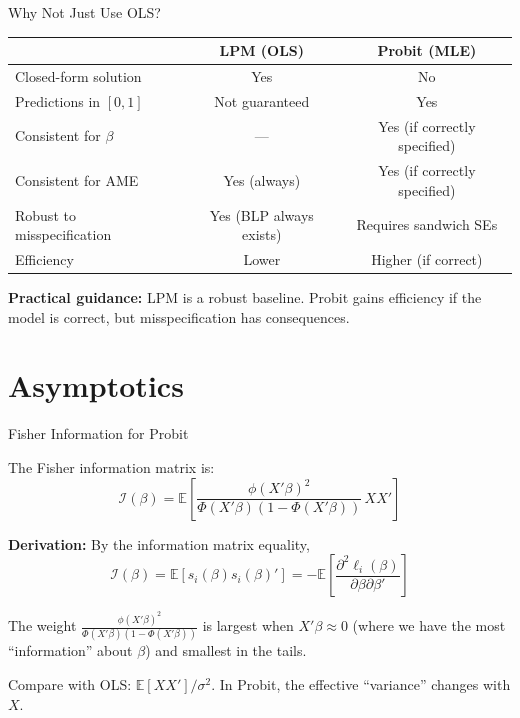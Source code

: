 \documentclass[aspectratio=169, handout, t]{beamer}
\numberwithin{equation}{section}
\begin{document}
\begin{frame}{Why Not Just Use OLS?}

\begin{center}
\renewcommand{\arraystretch}{1.4}
\begin{tabular}{lcc}
\toprule
& \textbf{LPM (OLS)} & \textbf{Probit (MLE)} \\
\midrule
Closed-form solution & Yes & No \\
Predictions in $[0,1]$ & Not guaranteed & Yes \\
Consistent for $\beta$ & --- & Yes (if correctly specified) \\
Consistent for AME & Yes (always) & Yes (if correctly specified) \\
Robust to misspecification & Yes (BLP always exists) & Requires sandwich SEs \\
Efficiency & Lower & Higher (if correct) \\
\bottomrule
\end{tabular}
\renewcommand{\arraystretch}{1.0}
\end{center}

\pause

\begin{tcolorbox}[colback=blue!5, colframe=blue!50]
\textbf{Practical guidance:} LPM is a robust baseline. Probit gains efficiency if the model is correct, but misspecification has consequences.
\end{tcolorbox}

\end{frame}

\section{Asymptotics}

\begin{frame}{Fisher Information for Probit}

The Fisher information matrix is:
\[
\mathcal{I}(\beta)
=
\mathbb{E}\left[\frac{\phi(X'\beta)^2}{\Phi(X'\beta)(1-\Phi(X'\beta))} \, XX'\right]
\]

\pause

\textbf{Derivation:} By the information matrix equality,
\[
\mathcal{I}(\beta) = \mathbb{E}[s_i(\beta) s_i(\beta)'] = -\mathbb{E}\left[\frac{\partial^2 \ell_i(\beta)}{\partial \beta \partial \beta'}\right]
\]

\pause

The weight $\frac{\phi(X'\beta)^2}{\Phi(X'\beta)(1-\Phi(X'\beta))}$ is largest when $X'\beta \approx 0$ (where we have the most ``information'' about $\beta$) and smallest in the tails.

\pause

\bigskip

Compare with OLS: $\mathbb{E}[X X'] / \sigma^2$. In Probit, the effective ``variance'' changes with $X$.

\end{frame}
\end{document}

